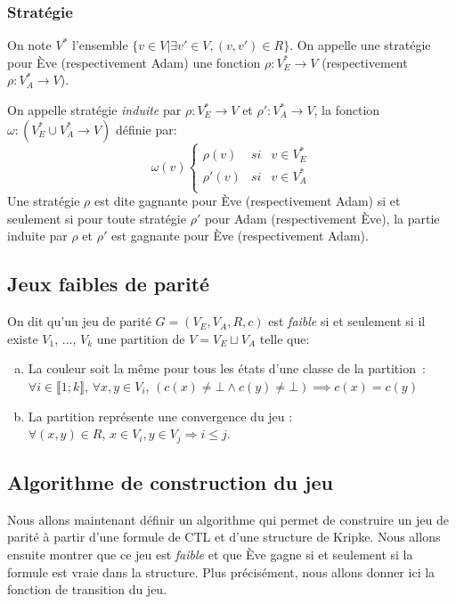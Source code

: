 \documentclass[10pt,a4paper]{article}
\begin{document}
\subsubsection{Stratégie}
On note $V^*$ l'ensemble $\{v \in V | \exists v' \in V, (v,v') \in R\}$.
On appelle une stratégie pour Ève (respectivement Adam) une fonction $\rho : V_E^* \to V$ (respectivement $\rho : V_A^* \to V$).

On appelle stratégie \emph{induite} par $\rho : V_E^* \to V$ et $\rho' : V_A^* \to V$, la fonction $\omega : (V_E^* \cup V_A^* \to V)$ définie par:
\\
$$\omega(v) \left \{
\begin{array}{rcl}
\rho(v) & si & v \in V_E^*\\
\rho'(v) & si & v \in V_A^*\\
\end{array}
\right .$$
Une stratégie $\rho$ est dite gagnante pour Ève (respectivement Adam) si et seulement si pour toute stratégie $\rho'$ pour Adam (respectivement Ève), la partie induite par $\rho$ et $\rho'$ est gagnante pour Ève (respectivement Adam).

\subsection{Jeux faibles de parité}
\label{fpg}

On dit qu'un jeu de parité $G = (V_E,V_A,R,c)$ est \emph{faible}  si et seulement si il existe $V_1$, ..., $V_k$ une partition de $V = V_E \sqcup V_A$ telle que:
\begin{enumerate}[a)]
\item La couleur soit la même pour tous les états d'une classe de la partition : $\forall i \in \llbracket 1 ; k \rrbracket$, $\forall x, y \in V_i$, $(c(x) \neq \bot \land c(y) \neq \bot)  \implies c(x) = c(y)$
\item La partition représente une convergence du jeu :\\
$\forall (x, y) \in R$, $x\in V_i, y \in V_j \Rightarrow i \leq j$.
\end{enumerate}

\subsection{Algorithme de construction du jeu}
Nous allons maintenant définir un algorithme qui permet de construire un jeu de parité à partir d'une formule de CTL et d'une structure de Kripke. Nous allons ensuite montrer que ce jeu est \emph{faible} et que Ève gagne si et seulement si la formule est vraie dans la structure. Plus précisément, nous allons donner ici la fonction de transition du jeu.
\end{document}
